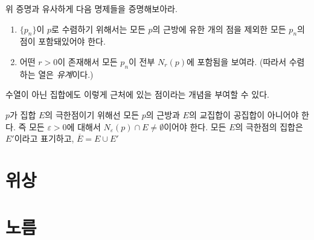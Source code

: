 \begin{exercise}
    위 증명과 유사하게 다음 명제들을 증명해보아라.

    \begin{enumerate}
        \item $\{p_n\}$이 $p$로 수렴하기 위해서는 모든 $p$의 근방에 유한 개의 점을 제외한 모든 $p_n$의 점이 포함돼있어야 한다.
        \item 어떤 $r > 0$이 존재해서 모든 $p_n$이 전부 $N_r(p)$에 포함됨을 보여라. (따라서 수렴하는 열은 \textit{유계}이다.)
    \end{enumerate}
\end{exercise}

수열이 아닌 집합에도 이렇게 근처에 있는 점이라는 개념을 부여할 수 있다.

\begin{definition}
    $p$가 집합 $E$의 극한점이기 위해선 모든 $p$의 근방과 $E$의 교집합이 공집합이 아니어야 한다.
    즉 모든 $\varepsilon > 0$에 대해서 $N_\varepsilon(p) \cap E \neq \emptyset$이어야 한다.
    모든 $E$의 극한점의 집합은 $E'$이라고 표기하고, $\overline{E} = E \cup E'$
\end{definition}

\section{위상}

\section{노름}